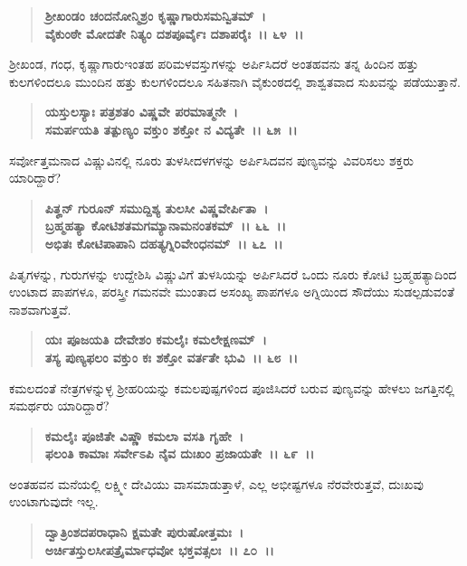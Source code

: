 \begin{verse}
\textbf{ಶ‍್ರೀಖಂಡಂ ಚಂದನೋನ್ಮಿಶ್ರಂ ಕೃಷ್ಣಾಗಾರುಸಮನ್ವಿತಮ್~।}\\\textbf{ವೈಕುಂಠೇ ಮೋದತೇ ನಿತ್ಯಂ ದಶಪೂರ್ವೈಃ ದಶಾಪರೈಃ~।। ೬೪~।।}
\end{verse}

ಶ‍್ರೀಖಂಡ, ಗಂಧ, ಕೃಷ್ಣಾಗಾರು\enginline{-}ಇಂತಹ ಪರಿಮಳವಸ್ತುಗಳನ್ನು ಅರ್ಪಿಸಿದರೆ ಅಂತಹವನು ತನ್ನ ಹಿಂದಿನ ಹತ್ತು ಕುಲಗಳಿಂದಲೂ ಮುಂದಿನ ಹತ್ತು ಕುಲಗಳಿಂದಲೂ ಸಹಿತನಾಗಿ ವೈಕುಂಠದಲ್ಲಿ ಶಾಶ್ವತವಾದ ಸುಖವನ್ನು ಪಡೆಯುತ್ತಾನೆ.

\begin{verse}
\textbf{ಯಸ್ತುಲಸ್ಯಾಃ ಪತ್ರಶತಂ ವಿಷ್ಣವೇ ಪರಮಾತ್ಮನೇ~।}\\\textbf{ಸಮರ್ಪಯತಿ ತತ್ಪುಣ್ಯಂ ವಕ್ತುಂ ಶಕ್ತೋ ನ ವಿದ್ಯತೇ~।। ೬೫~।।}
\end{verse}

ಸರ್ವೋತ್ತಮನಾದ ವಿಷ್ಣುವಿನಲ್ಲಿ ನೂರು ತುಳಸೀದಳಗಳನ್ನು ಅರ್ಪಿಸಿದವನ ಪುಣ್ಯವನ್ನು ವಿವರಿಸಲು ಶಕ್ತರು ಯಾರಿದ್ದಾರೆ?

\begin{verse}
\textbf{ಪಿತೄನ್ ಗುರೂನ್ ಸಮುದ್ದಿಶ್ಯ ತುಲಸೀ ವಿಷ್ಣವೇರ್ಪಿತಾ~।}\\\textbf{ಬ್ರಹ್ಮಹತ್ಯಾ ಕೋಟಿಶತಮಗಮ್ಯಾನಾಮನಂತಕಮ್~।। ೬೬~।।}\\\textbf{ಅಭಿತಃ ಕೋಟಿಪಾಪಾನಿ ದಹತ್ಯಗ್ನಿರಿವೇಂಧನಮ್~।। ೬೭~।।}
\end{verse}

ಪಿತೃಗಳನ್ನು, ಗುರುಗಳನ್ನು ಉದ್ದೇಶಿಸಿ ವಿಷ್ಣುವಿಗೆ ತುಳಸಿಯನ್ನು ಅರ್ಪಿಸಿದರೆ ಒಂದು ನೂರು ಕೋಟಿ ಬ್ರಹ್ಮಹತ್ಯಾದಿಂದ ಉಂಟಾದ ಪಾಪಗಳೂ, ಪರಸ್ತ್ರೀ ಗಮನವೇ ಮುಂತಾದ ಅಸಂಖ್ಯ ಪಾಪಗಳೂ ಅಗ್ನಿಯಿಂದ ಸೌದೆಯು ಸುಡಲ್ಪಡುವಂತೆ ನಾಶವಾಗುತ್ತವೆ.

\begin{verse}
\textbf{ಯಃ ಪೂಜಯತಿ ದೇವೇಶಂ ಕಮಲೈಃ ಕಮಲೇಕ್ಷಣಮ್~।}\\\textbf{ತಸ್ಯ ಪುಣ್ಯಫಲಂ ವಕ್ತುಂ ಕಃ ಶಕ್ತೋ ವರ್ತತೇ ಭುವಿ~।। ೬೮~।।}
\end{verse}

ಕಮಲದಂತೆ ನೇತ್ರಗಳನ್ನುಳ್ಳ ಶ‍್ರೀಹರಿಯನ್ನು ಕಮಲಪುಷ್ಪಗಳಿಂದ ಪೂಜಿಸಿದರೆ ಬರುವ ಪುಣ್ಯವನ್ನು ಹೇಳಲು ಜಗತ್ತಿನಲ್ಲಿ ಸಮರ್ಥರು ಯಾರಿದ್ದಾರೆ?

\begin{verse}
\textbf{ಕಮಲೈಃ ಪೂಜಿತೇ ವಿಷ್ಣೌ ಕಮಲಾ ವಸತಿ ಗೃಹೇ~।}\\\textbf{ಫಲಂತಿ ಕಾಮಾಃ ಸರ್ವೇಽಪಿ ನೈವ ದುಃಖಂ ಪ್ರಜಾಯತೇ~।। ೬೯~।।}
\end{verse}

ಅಂತಹವನ ಮನೆಯಲ್ಲಿ ಲಕ್ಷ್ಮೀ ದೇವಿಯು ವಾಸಮಾಡುತ್ತಾಳೆ, ಎಲ್ಲ ಅಭೀಷ್ಟಗಳೂ ನೆರವೇರುತ್ತವೆ, ದುಃಖವು ಉಂಟಾಗುವುದೇ ಇಲ್ಲ.

\begin{verse}
\textbf{ದ್ವಾತ್ರಿಂಶದಪರಾಧಾನಿ ಕ್ಷಮತೇ ಪುರುಷೋತ್ತಮಃ~।}\\\textbf{ಅರ್ಚಿತಸ್ತುಲಸೀಪತ್ರೈರ್ಮಾಧವೋ ಭಕ್ತವತ್ಸಲಃ~।। ೭೦~।।}
\end{verse}

